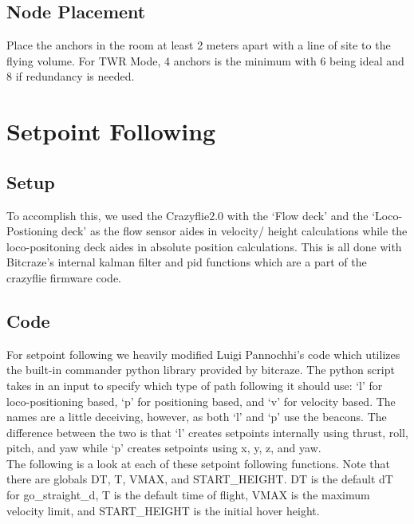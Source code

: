 \documentclass[]{article}
\begin{document}
\subsection{Node Placement}

\noindent Place the anchors in the room at least 2 meters apart with a line of site to the flying volume. For TWR Mode, 4 anchors is the minimum with 6 being ideal and 8 if redundancy is needed.

\section{Setpoint Following}

\subsection{Setup}

\noindent To accomplish this, we used the Crazyflie2.0 with the `Flow deck' %
 and the `Loco-Postioning deck' %
 as the flow sensor aides in velocity/ height calculations while the loco-positoning deck aides in absolute position calculations. This is all done with Bitcraze's internal kalman filter and pid functions which are a part of the crazyflie firmware code.
 
\subsection{Code}

\noindent For setpoint following we heavily modified Luigi Pannochhi's code which utilizes the built-in commander python library provided by bitcraze. The python script takes in an input to specify which type of path following it should use: `l' for loco-positioning based, `p' for positioning based, and `v' for velocity based. The names are a little deceiving, however, as both `l' and `p' use the beacons. The difference between the two is that `l' creates setpoints internally using thrust, roll, pitch, and yaw while `p' creates setpoints using x, y, z, and yaw.\\

\noindent The following is a look at each of these setpoint following functions. Note that there are globals DT, T, VMAX, and START\_HEIGHT. DT is the default dT for go\_straight\_d, T is the default time of flight, VMAX is the maximum velocity limit, and START\_HEIGHT is the initial hover height.
\end{document}
